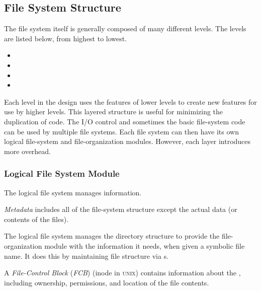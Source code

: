 \subsection{File System Structure}\label{subsec:File_System_Structure}
The file system itself is generally composed of many different levels.
The levels are listed below, from highest to lowest.
\begin{itemize}[noitemsep]
\item {}
\item {}
\item {}
\item {}
\end{itemize}

Each level in the design uses the features of lower levels to create new features for use by higher levels.
This layered structure is useful for minimizing the duplication of code.
The I/O control and sometimes the basic file-system code can be used by multiple file systems.
Each file system can then have its own logical file-system and file-organization modules.
However, each layer introduces more overhead.

\subsubsection{Logical File System Module}\label{subsubsec:Logical_FS_Module}
The logical file system manages  information.

\begin{definition}[Metadata]\label{def:File_Metadata}
  \emph{Metadata} includes all of the file-system structure except the actual data (or contents of the files).
\end{definition}

The logical file system manages the directory structure to provide the file-organization module with the information it needs, when given a symbolic file name.
It does this by maintaining file structure via s.

\begin{definition}\label{def:File_Control_Block}
  A \emph{File-Control Block} (\emph{FCB}) (inode in \textsc{unix}) contains information about the , including ownership, permissions, and location of the file contents.
\end{definition}

